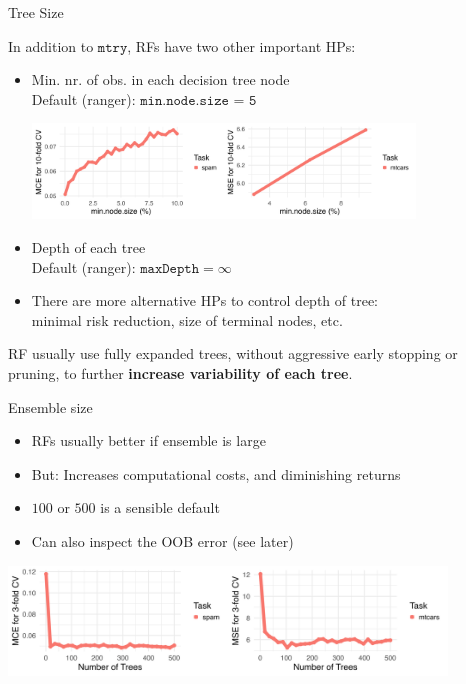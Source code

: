 \documentclass[11pt,compress,t,notes=noshow, xcolor=table]{beamer}
\begin{document}
\begin{vbframe}{Tree Size}

In addition to $\texttt{mtry}$, RFs have two other important HPs:

\begin{itemize}
  \item Min. nr. of obs. in each decision tree node \\
    Default (ranger): $\texttt{min.node.size = 5}$ 
\begin{center}
\includegraphics[width=0.8\textwidth]{figure/forest-minnode.png}
\end{center}
  \item Depth of each tree \\
    Default (ranger): $\texttt{maxDepth} = \infty$
  \item There are more alternative HPs to control depth of tree:\\
    minimal risk reduction, size of terminal nodes, etc.
\end{itemize}

\lz

RF usually use fully expanded trees, without aggressive early stopping or pruning, to further \textbf{increase variability of each tree}. 
\end{vbframe}

\begin{vbframe}{Ensemble size}
\begin{itemize}
\item RFs usually better if ensemble is large 
\item But: Increases computational costs, and diminishing returns
\item $100$ or $500$ is a sensible default
\item Can also inspect the OOB error (see later)
\end{itemize}

\lz


\begin{center}
\includegraphics[width=330pt]{figure/forest-ntree.png}
\end{center}
\end{vbframe}
\end{document}
